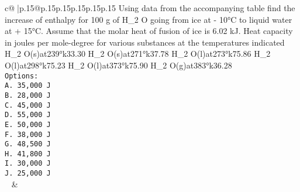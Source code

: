 \documentclass{article}
\begin{document}
{\begin{supertabular}{c@{$\;$}|p{.15\linewidth}@{}p{.15\linewidth}p{.15\linewidth}p{.15\linewidth}p{.15\linewidth}p{.15\linewidth}}
{{{Using data from the accompanying table find the increase of enthalpy for 100 g of H_2 O going from ice at - 10°C to liquid water at + 15°C. Assume that the molar heat of fusion of ice is 6.02 kJ. Heat capacity in joules per mole-degree for various substances at the temperatures indicated H_2 O(s)at239°k33.30 H_2 O(s)at271°k37.78 H_2 O(l)at273°k75.86 H_2 O(l)at298°k75.23 H_2 O(l)at373°k75.90 H_2 O(g)at383°k36.28\\ \tt Options:\\ \tt A. 35,000 J\\ \tt B. 28,000 J\\ \tt C. 45,000 J\\ \tt D. 55,000 J\\ \tt E. 50,000 J\\ \tt F. 38,000 J\\ \tt G. 48,500 J\\ \tt H. 41,800 J\\ \tt I. 30,000 J\\ \tt J. 25,000 J\\ \tt  
	  } 
	   } 
	   } 
	 & \\ 
 

    \theutterance {}  


\end{supertabular}}
\end{document}

